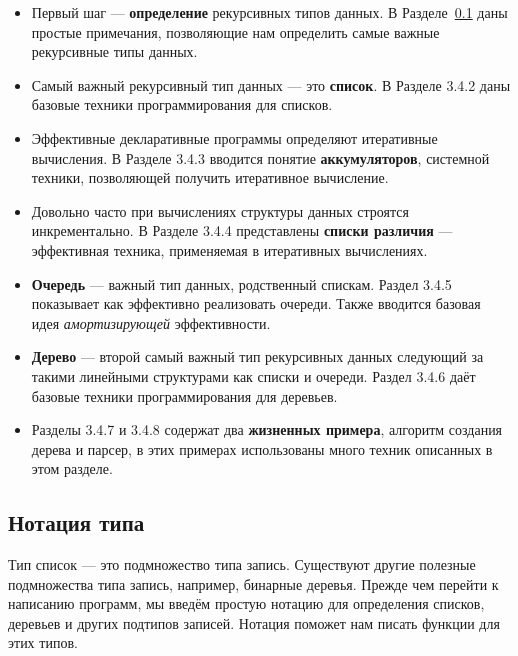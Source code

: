 \begin{itemize}
\item{Первый шаг --- \textbf{определение} рекурсивных типов данных. В Разделе~\ref{type_notation} даны простые примечания, позволяющие нам определить самые важные рекурсивные типы данных.}

\item{Самый важный рекурсивный тип данных --- это \textbf{список}. В Разделе 3.4.2 даны базовые техники программирования для списков.}

\item{Эффективные декларативные программы определяют итеративные вычисления. В Разделе 3.4.3 вводится понятие \textbf{аккумуляторов}, системной техники, позволяющей получить итеративное вычисление.}

\item{Довольно часто при вычислениях структуры данных строятся инкрементально. В Разделе 3.4.4 представлены \textbf{списки различия} --- эффективная техника, применяемая в итеративных вычислениях.}

\item{\textbf{Очередь} --- важный тип данных, родственный спискам. Раздел 3.4.5 показывает как эффективно реализовать очереди. Также вводится базовая идея \emph{амортизирующей} эффективности.}

\item{\textbf{Дерево} --- второй самый важный тип рекурсивных данных следующий за такими линейными структурами как списки и очереди. Раздел 3.4.6 даёт базовые техники программирования для деревьев.}

\item{Разделы 3.4.7 и 3.4.8 содержат два \textbf{жизненных примера}, алгоритм создания дерева и парсер, в этих примерах использованы много техник описанных в этом разделе.}
\end{itemize}

\subsection{Нотация типа}\label{type_notation}

Тип список --- это подмножество типа запись. Существуют другие полезные подмножества типа запись, например, бинарные деревья. Прежде чем перейти к написанию программ, мы введём простую нотацию для определения списков, деревьев и других подтипов записей. Нотация поможет нам писать функции для этих типов.

